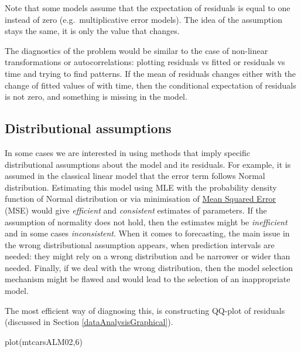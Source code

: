 \documentclass[
]{book}
\newenvironment{Shaded}{\begin{snugshade}}{\end{snugshade}}
\newcommand{\DecValTok}[1]{\textcolor[rgb]{0.00,0.00,0.81}{#1}}
\newcommand{\FunctionTok}[1]{\textcolor[rgb]{0.00,0.00,0.00}{#1}}
\newcommand{\NormalTok}[1]{#1}
\theoremstyle{definition}
\theoremstyle{definition}
\theoremstyle{definition}
\theoremstyle{definition}
\theoremstyle{remark}
\begin{document}
Note that some models assume that the expectation of residuals is equal to one instead of zero (e.g.~multiplicative error models). The idea of the assumption stays the same, it is only the value that changes.

The diagnostics of the problem would be similar to the case of non-linear transformations or autocorrelations: plotting residuals vs fitted or residuals vs time and trying to find patterns. If the mean of residuals changes either with the change of fitted values of with time, then the conditional expectation of residuals is not zero, and something is missing in the model.

\hypertarget{assumptionsDistribution}{%
\subsection{Distributional assumptions}\label{assumptionsDistribution}}

In some cases we are interested in using methods that imply specific distributional assumptions about the model and its residuals. For example, it is assumed in the classical linear model that the error term follows Normal distribution. Estimating this model using MLE with the probability density function of Normal distribution or via minimisation of \protect\hyperlink{errorMeasures}{Mean Squared Error} (MSE) would give \emph{efficient} and \emph{consistent} estimates of parameters. If the assumption of normality does not hold, then the estimates might be \emph{inefficient} and in some cases \emph{inconsistent}. When it comes to forecasting, the main issue in the wrong distributional assumption appears, when prediction intervals are needed: they might rely on a wrong distribution and be narrower or wider than needed. Finally, if we deal with the wrong distribution, then the model selection mechanism might be flawed and would lead to the selection of an inappropriate model.

The most efficient way of diagnosing this, is constructing QQ-plot of residuals (discussed in Section \ref{dataAnalysisGraphical}).

\begin{Shaded}
\begin{Highlighting}[]
\FunctionTok{plot}\NormalTok{(mtcarsALM02,}\DecValTok{6}\NormalTok{)}
\end{Highlighting}
\end{Shaded}
\end{document}
